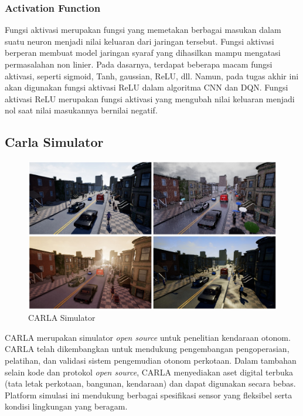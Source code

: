\subsubsection{Activation Function}
Fungsi aktivasi merupakan fungsi yang memetakan berbagai masukan dalam suatu neuron menjadi nilai keluaran dari jaringan tersebut. Fungsi aktivasi berperan membuat model jaringan syaraf yang dihasilkan mampu mengatasi permasalahan non linier. Pada dasarnya, terdapat beberapa macam fungsi aktivasi, seperti sigmoid, Tanh, gaussian, ReLU, dll. Namun, pada tugas akhir ini akan digunakan fungsi aktivasi ReLU dalam algoritma CNN dan DQN. Fungsi aktivasi ReLU merupakan fungsi aktivasi yang mengubah nilai keluaran menjadi nol saat nilai masukannya bernilai negatif.

\subsection{Carla Simulator}
\begin{figure}[H] 
	\centering
	\includegraphics[width=.4\linewidth]{images/carlasim}
	\caption{CARLA Simulator}
	\label{fig:carlasim}
\end{figure}
CARLA merupakan simulator \textit{open source }untuk penelitian kendaraan otonom. CARLA telah dikembangkan untuk mendukung pengembangan pengoperasian, pelatihan, dan validasi sistem pengemudian otonom perkotaan. Dalam tambahan selain kode dan protokol \textit{open source}, CARLA menyediakan aset digital terbuka (tata letak perkotaan, bangunan, kendaraan) dan dapat digunakan secara bebas. Platform simulasi ini mendukung berbagai spesifikasi sensor yang fleksibel serta kondisi lingkungan yang beragam. \cite{cit:carlasim}

\iffalse
